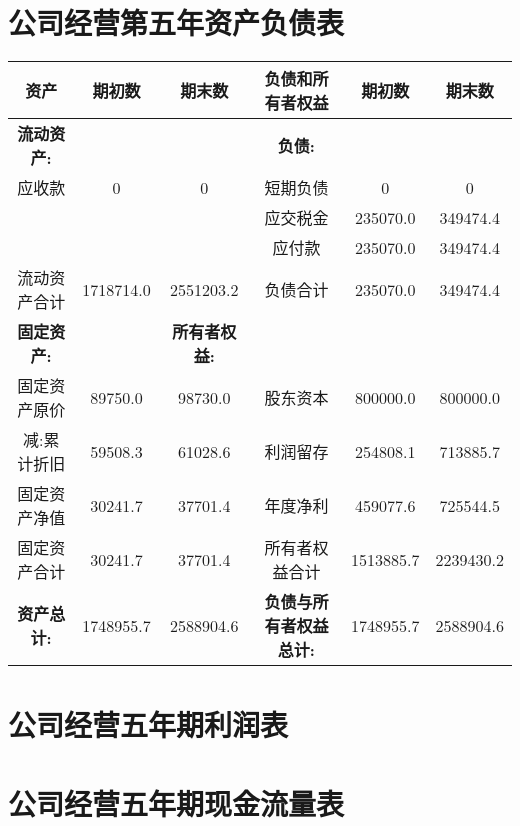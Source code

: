 \appendix
\section{公司经营第五年资产负债表}
\begin{table}[htbp]
\begin{tabular}{|c|c|c|c|c|c|}
\hline
资产&期初数&期末数&负债和所有者权益&期初数&期末数\\
\hline
\bfseries 流动资产:& & & \bfseries 负债: & \\
\hline
应收款&0&0&短期负债&0&0\\
\hline
& & &应交税金&235070.0&349474.4\\
\hline
& & &应付款&235070.0&349474.4\\
\hline
流动资产合计& 1718714.0& 2551203.2& 负债合计& 235070.0&349474.4\\
\hline
\bfseries 固定资产: & & \bfseries 所有者权益: & \\
\hline
固定资产原价&89750.0&98730.0&股东资本&800000.0&800000.0\\
\hline
减:累计折旧&59508.3&61028.6&利润留存&254808.1&713885.7\\
\hline
固定资产净值&30241.7&37701.4&年度净利&459077.6&725544.5\\
\hline
固定资产合计&30241.7&37701.4&所有者权益合计&1513885.7&2239430.2\\
\hline
\bfseries 资产总计:&1748955.7&2588904.6&\bfseries 负债与所有者权益总计:&
        1748955.7&2588904.6\\
\hline
\end{tabular}
\end{table}

\section{公司经营五年期利润表}

\section{公司经营五年期现金流量表}
